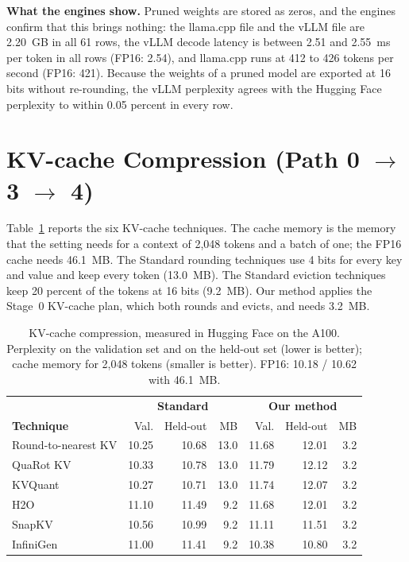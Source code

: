 \textbf{What the engines show.} Pruned weights are stored as zeros, and the engines confirm that this brings nothing: the llama.cpp file and the vLLM file are 2.20~GB in all 61 rows, the vLLM decode latency is between 2.51 and 2.55~ms per token in all rows (FP16: 2.54), and llama.cpp runs at 412 to 426 tokens per second (FP16: 421). Because the weights of a pruned model are exported at 16 bits without re-rounding, the vLLM perplexity agrees with the Hugging Face perplexity to within 0.05 percent in every row.

\section{KV-cache Compression (Path 0 $\rightarrow$ 3 $\rightarrow$ 4)}
\label{sec:ch5-kv}

Table~\ref{tab:ch5-kv} reports the six KV-cache techniques. The cache memory is the memory that the setting needs for a context of 2{,}048 tokens and a batch of one; the FP16 cache needs 46.1~MB. The Standard rounding techniques use 4 bits for every key and value and keep every token (13.0~MB). The Standard eviction techniques keep 20 percent of the tokens at 16 bits (9.2~MB). Our method applies the Stage~0 KV-cache plan, which both rounds and evicts, and needs 3.2~MB.

\begin{table}[htbp]
\centering
\small
\caption{KV-cache compression, measured in Hugging Face on the A100. Perplexity on the validation set and on the held-out set (lower is better); cache memory for 2{,}048 tokens (smaller is better). FP16: 10.18 / 10.62 with 46.1~MB.}
\label{tab:ch5-kv}
\renewcommand{\arraystretch}{1.15}
\begin{tabularx}{\textwidth}{Xrrrrrr}
\hline
 & \multicolumn{3}{c}{\textbf{Standard}} & \multicolumn{3}{c}{\textbf{Our method}} \\
\textbf{Technique} & Val. & Held-out & MB & Val. & Held-out & MB \\
\hline
Round-to-nearest KV & 10.25 & 10.68 & 13.0 & 11.68 & 12.01 & 3.2 \\
QuaRot KV & 10.33 & 10.78 & 13.0 & 11.79 & 12.12 & 3.2 \\
KVQuant & 10.27 & 10.71 & 13.0 & 11.74 & 12.07 & 3.2 \\
H2O & 11.10 & 11.49 & 9.2 & 11.68 & 12.01 & 3.2 \\
SnapKV & 10.56 & 10.99 & 9.2 & 11.11 & 11.51 & 3.2 \\
InfiniGen & 11.00 & 11.41 & 9.2 & 10.38 & 10.80 & 3.2 \\
\hline
\end{tabularx}
\end{table}

